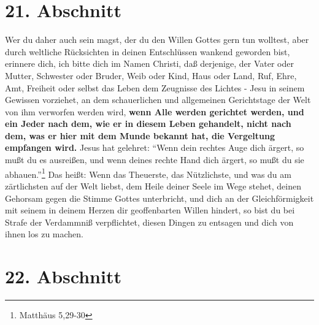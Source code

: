 \section{21. Abschnitt} \label{kap4_ab21}

Wer du daher auch sein magst, der du den Willen Gottes gern tun wolltest, aber
durch weltliche Rücksichten in deinen Entschlüssen wankend geworden bist,
erinnere dich, ich bitte dich im Namen Christi, daß derjenige, der Vater oder
Mutter, Schwester oder Bruder, Weib oder Kind, Haus oder Land, Ruf, Ehre, Amt,
Freiheit oder selbst das Leben dem Zeugnisse des Lichtes - Jesu in seinem
Gewissen vorziehet, an dem schauerlichen und allgemeinen Gerichtstage der Welt
von ihm verworfen werden wird, \textbf{wenn Alle werden gerichtet werden, und ein Jeder
nach dem, wie er in diesem Leben gehandelt, nicht nach dem, was er hier mit dem
Munde bekannt hat, die Vergeltung empfangen wird.} Jesus hat gelehret: "`Wenn
dein rechtes Auge dich ärgert, so mußt du es ausreißen, und wenn deines rechte
Hand dich ärgert, so mußt du sie abhauen."'\footnote{Matthäus  5,29-30} Das heißt:
Wenn das Theuerste, das Nützlichste, und was du am zärtlichsten auf der Welt
liebst, dem Heile deiner Seele im Wege stehet, deinen Gehorsam gegen die Stimme
Gottes unterbricht, und dich an der Gleichförmigkeit mit seinem in deinem Herzen
dir geoffenbarten Willen hindert, so bist du bei Strafe der Verdammniß
verpflichtet, diesen Dingen zu entsagen und dich von ihnen los zu machen.

\section{22. Abschnitt} \label{kap4_ab22}

